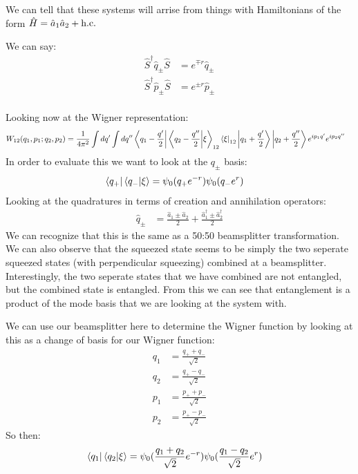 We can tell that these systems will arrise from things with Hamiltonians of the form $\hat{H} = \hat{a}_1\hat{a}_2 + \text{h.c.}$

We can say:
\begin{align*}
	\hat{S}^\dagger \hat{q}_\pm \hat{S} &= e^{\mp r} \hat{q}_\pm \\
	\hat{S}^\dagger \hat{p}_\pm \hat{S} &= e^{\pm r} \hat{p}_\pm \\
\end{align*}

Looking now at the Wigner representation:
\begin{align*}
	W_{12}(q_1,p_1;q_2,p_2) &= \frac{1}{4\pi^2} \int dq'\int dq'' \bra{q_1 - \frac{q'}{2}}\bra{q_2 - \frac{q''}{2}} \ket{\xi}_{12}\bra{\xi}_{12}\ket{q_1 + \frac{q'}{2}}\ket{q_2 + \frac{q''}{2}} e^{ip_1q'} e^{ip_2q''}
\end{align*}
In order to evaluate this we want to look at the $q_\pm$ basis:
\begin{align*}
	\bra{q_+}\bra{q_-}\ket{\xi} &= \psi_0(q_+ e^{-r})\psi_0(q_- e^r)
\end{align*}
Looking at the quadratures in terms of creation and annihilation operators:
\begin{align*}
	\hat{q}_\pm &= \frac{\hat{a}_1 \pm \hat{a}_2}{2} + \frac{\hat{a}_1^\dagger \pm \hat{a}_2^\dagger}{2}
\end{align*}
We can recognize that this is the same as a 50:50 beamsplitter transformation. We can also observe that the squeezed state seems to be simply the two seperate squeezed states (with perpendicular squeezing) combined at a beamsplitter.
Interestingly, the two seperate states that we have combined are not entangled, but the combined state is entangled. From this we can see that entanglement is a product of the mode basis that we are looking at the system with.

We can use our beamsplitter here to determine the Wigner function by looking at this as a change of basis for our Wigner function:
\begin{align*}
	q_1 &= \frac{q_+ + q_-}{\sqrt{2}} \\
	q_2 &= \frac{q_+ - q_-}{\sqrt{2}} \\
	p_1 &= \frac{p_+ + p_-}{\sqrt{2}} \\
	p_2 &= \frac{p_+ - p_-}{\sqrt{2}}
\end{align*}
So then:
\begin{align*}
	\bra{q_1}\bra{q_2}\ket{\xi} &= \psi_0(\frac{q_1 + q_2}{\sqrt{2}} e^{-r})\psi_0(\frac{q_1 - q_2}{\sqrt{2}} e^r)
\end{align*}

